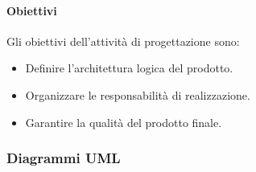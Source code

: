 		\paragraph{Obiettivi}\label{PP:Sviluppo:Progettazione:Obiettivi}
        Gli obiettivi dell'attività di progettazione sono:
        \begin{itemize}
			\item Definire l'architettura logica del prodotto.
			\item Organizzare le responsabilità di realizzazione.
			\item Garantire la qualità del prodotto finale.
		\end{itemize}


		\subsubsection{Diagrammi UML}\label{PP:Sviluppo:UML}

